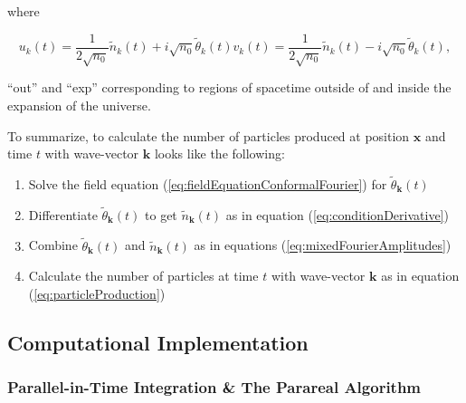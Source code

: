 \documentclass{article}
\begin{document}
            where

            \begin{subequations} \label{eq:mixedFourierAmplitudes}
            \begin{equation}
                u_k(t) = \frac{1}{2 \sqrt{n_0}} \widetilde{n}_k(t) + i \sqrt{n_0} \widetilde{\theta}_k(t)
            \end{equation}
            \begin{equation}
                v_k(t) = \frac{1}{2 \sqrt{n_0}} \widetilde{n}_k(t) - i \sqrt{n_0} \widetilde{\theta}_k(t),
            \end{equation}
            \end{subequations}

            ``out'' and ``exp'' corresponding to regions of spacetime outside of and inside the expansion of the universe.

            To summarize, to calculate the number of particles produced at position $\mathbf{x}$ and time $t$ with wave-vector $\mathbf{k}$ looks like the following:

            \begin{enumerate}
                \item Solve the field equation (\ref{eq:fieldEquationConformalFourier}) for $\widetilde{\theta}_\mathbf{k}(t)$
                \item Differentiate $\widetilde{\theta}_\mathbf{k}(t)$ to get $\widetilde{n}_\mathbf{k}(t)$ as in equation (\ref{eq:conditionDerivative})
                \item Combine $\widetilde{\theta}_\mathbf{k}(t)$ and $\widetilde{n}_\mathbf{k}(t)$ as in equations (\ref{eq:mixedFourierAmplitudes})
                \item Calculate the number of particles at time $t$ with wave-vector $\mathbf{k}$ as in equation (\ref{eq:particleProduction})
            \end{enumerate}

\pagebreak

    \subsection{Computational Implementation}

        \subsubsection{Parallel-in-Time Integration \& The Parareal Algorithm}
\end{document}
